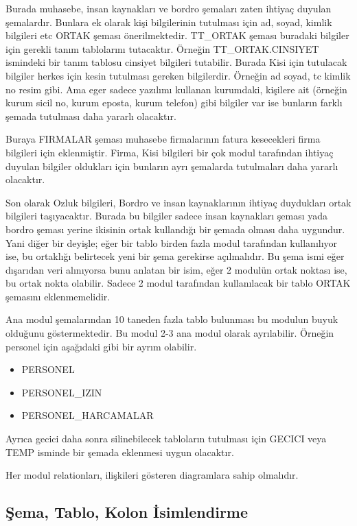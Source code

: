 \documentclass[10pt,a4paper,draft]{article}
\begin{document}
Burada muhasebe, insan kaynakları ve bordro şemaları zaten ihtiyaç duyulan şemalardır.
Bunlara ek olarak kişi bilgilerinin tutulması için ad, soyad, kimlik bilgileri etc ORTAK şeması
önerilmektedir. TT\_ORTAK şeması buradaki bilgiler için gerekli tanım tablolarını tutacaktır.
Örneğin TT\_ORTAK.CINSIYET ismindeki bir tanım tablosu cinsiyet bilgileri tutabilir.
Burada Kisi için tutulacak bilgiler herkes için kesin tutulması gereken bilgilerdir. 
Örneğin ad soyad, tc kimlik no resim gibi. Ama eger sadece yazılımı kullanan kurumdaki,
kişilere ait  (örneğin kurum sicil no, kurum eposta, kurum telefon) gibi bilgiler  var ise 
bunların farklı şemada tutulması daha yararlı olacaktır. 

Buraya FIRMALAR şeması muhasebe firmalarının fatura kesecekleri firma bilgileri için eklenmiştir.
Firma, Kisi bilgileri bir çok modul tarafından ihtiyaç duyulan bilgiler oldukları için bunların
ayrı şemalarda tutulmaları daha yararlı olacaktır.

Son olarak Ozluk bilgileri, Bordro ve insan kaynaklarının ihtiyaç duydukları ortak bilgileri taşıyacaktır.
Burada bu bilgiler sadece insan kaynakları şeması yada bordro şeması yerine ikisinin ortak kullandığı
bir şemada olması daha uygundur.
Yani diğer bir deyişle; eğer bir tablo birden fazla modul tarafından kullanılıyor ise,
bu ortaklığı belirtecek yeni bir şema gerekirse açılmalıdır. 
Bu şema ismi eğer dışarıdan veri alınıyorsa bunu anlatan bir isim,
eğer 2 modulün ortak noktası ise, bu ortak nokta olabilir.
Sadece 2 modul tarafından kullanılacak bir tablo ORTAK şemasını eklenmemelidir.

Ana modul şemalarından 10 taneden fazla tablo bulunması bu modulun buyuk olduğunu göstermektedir.
Bu modul 2-3 ana modul olarak ayrılabilir. Örneğin personel için aşağıdaki gibi bir ayrım olabilir.
\begin{itemize}
\item PERSONEL
\item PERSONEL\_IZIN
\item PERSONEL\_HARCAMALAR
\end{itemize}


Ayrıca gecici daha sonra silinebilecek tabloların tutulması için GECICI veya TEMP isminde bir şemada
eklenmesi uygun olacaktır.

Her modul relationları, ilişkileri gösteren diagramlara sahip olmalıdır.



\subsection{Şema, Tablo, Kolon İsimlendirme}
\end{document}
